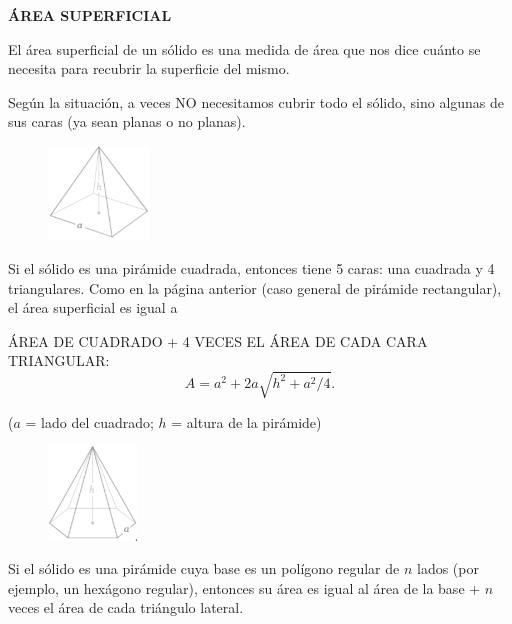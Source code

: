 \documentclass[12pt,a4paper]{article}
\begin{document}
\begin{tcolorbox}[colback=fondorosa, colframe=rojoclaro, title=\textbf{Mini-explicación: Área superficial: ¿cuánto se necesita para cubrir la superficie de un sólido?}, breakable]
\textbf{ÁREA SUPERFICIAL}

El área superficial de un sólido es una medida de área que nos dice cuánto se necesita para recubrir la superficie del mismo.

Según la situación, a veces NO necesitamos cubrir todo el sólido, sino algunas de sus caras (ya sean planas o no planas).

\begin{figure}
\centering
\vspace{-10pt}
\includegraphics[height=2.5cm]{Figuras/fig70.png}
\vspace{-10pt}
\end{figure}

Si el sólido es una pirámide cuadrada, entonces tiene 5 caras: una cuadrada y 4 triangulares. Como en la página anterior (caso general de pirámide rectangular), el área superficial es igual a

ÁREA DE CUADRADO + 4 VECES EL ÁREA DE CADA CARA TRIANGULAR:
$$A = a^2 + 2a\sqrt{h^2 + a^2/4}.$$

($a$ = lado del cuadrado; $h$ = altura de la pirámide)

\begin{figure}
\centering
\vspace{-10pt}
\includegraphics[height=2.5cm]{Figuras/fig71.png}
\vspace{-10pt}
\end{figure}

Si el sólido es una pirámide cuya base es un polígono regular de $n$ lados (por ejemplo, un hexágono regular), entonces su área es igual al área de la base + $n$ veces el área de cada triángulo lateral.


\end{tcolorbox}
\end{document}

